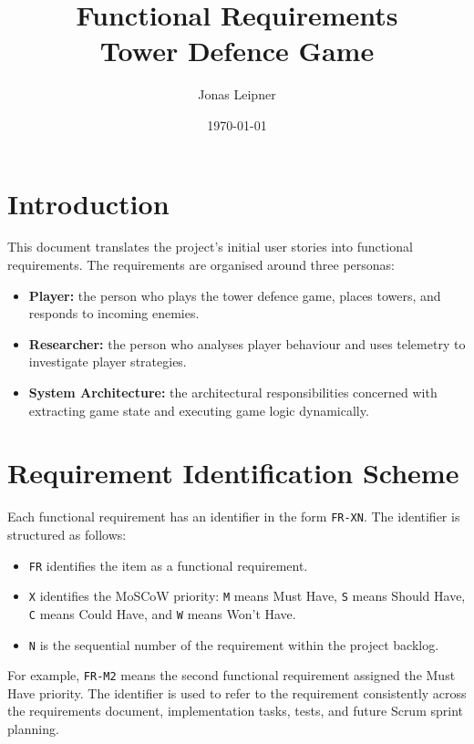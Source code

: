\documentclass[12pt,a4paper]{article}
\title{\textbf{Functional Requirements}\\Tower Defence Game}
\author{Jonas Leipner}
\date{\today}
\begin{document}
\maketitle

\section{Introduction}
\label{sec:introduction}

This document translates the project's initial user stories into functional
requirements. The requirements are organised around three personas:
\begin{itemize}[leftmargin=*]
    \item \textbf{Player:} the person who plays the tower defence game,
    places towers, and responds to incoming enemies.
    \item \textbf{Researcher:} the person who analyses player behaviour and
    uses telemetry to investigate player strategies.
    \item \textbf{System Architecture:} the architectural responsibilities
    concerned with extracting game state and executing game logic dynamically.
\end{itemize}


\section{Requirement Identification Scheme}
\label{sec:requirement-identification}

Each functional requirement has an identifier in the form
\texttt{FR-XN}. The identifier is structured as follows:
\begin{itemize}[leftmargin=*]
    \item \texttt{FR} identifies the item as a functional requirement.
    \item \texttt{X} identifies the MoSCoW priority:
    \texttt{M} means Must Have, \texttt{S} means Should Have,
    \texttt{C} means Could Have, and \texttt{W} means Won't Have.
    \item \texttt{N} is the sequential number of the requirement within the
    project backlog.
\end{itemize}

For example, \texttt{FR-M2} means the second functional requirement assigned
the Must Have priority. The identifier is used to refer to the requirement
consistently across the requirements document, implementation tasks, tests,
and future Scrum sprint planning.
\end{document}

